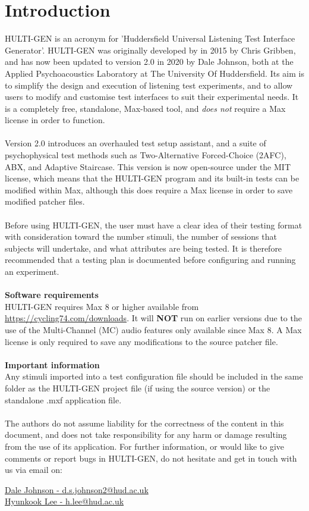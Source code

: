 \chapter{Introduction}
HULTI-GEN is an acronym for 'Huddersfield Universal Listening Test Interface Generator'. HULTI-GEN was originally developed by in 2015 by Chris Gribben, and has now been updated to version 2.0 in 2020 by Dale Johnson, both at the Applied Psychoacoustics Laboratory at The University Of Huddersfield. Its aim is to simplify the design and execution of listening test experiments, and to allow users to modify and customise test interfaces to suit their experimental needs. It is a completely free, standalone, Max-based tool, and \emph{does not} require a Max license in order to function. 
\\
\\
Version 2.0 introduces an overhauled test setup assistant, and a suite of psychophysical test methods such as Two-Alternative Forced-Choice (2AFC), ABX, and Adaptive Staircase. This version is now open-source under the MIT license, which means that the HULTI-GEN program and its built-in tests can be modified within Max, although this does require a Max license in order to save modified patcher files.
\\
\\
Before using HULTI-GEN, the user must have a clear idea of their testing format with consideration toward the number stimuli, the number of sessions that subjects will undertake, and what attributes are being tested. It is therefore recommended that a testing plan is documented before configuring and running an experiment.
\\
\\
\textbf{Software requirements}\\
HULTI-GEN requires Max 8 or higher available from \href{https://cycling74.com/downloads}{https://cycling74.com/downloads}. It will \textbf{NOT} run on earlier versions due to the use of the Multi-Channel (MC) audio features only available since Max 8. A Max license is only required to save any modifications to the source patcher file.
\\
\\
\textbf{Important information}\\
Any stimuli imported into a test configuration file should be included in the same folder as the HULTI-GEN project file (if using the source version) or the standalone .mxf application file.
\\
\\
The authors do not assume liability for the correctness of the content in this document, and does not take responsibility for any harm or damage resulting from the use of its application. For further information, or would like to give comments or report bugs in HULTI-GEN, do not hesitate and get in touch with us via email on:
\begin{center}
\href{mailto::d.s.johnson2@hud.ac.uk}{Dale Johnson - d.s.johnson2@hud.ac.uk}
\\
\href{mailto::h.lee@hud.ac.uk}{Hyunkook Lee - h.lee@hud.ac.uk}
\end{center}
